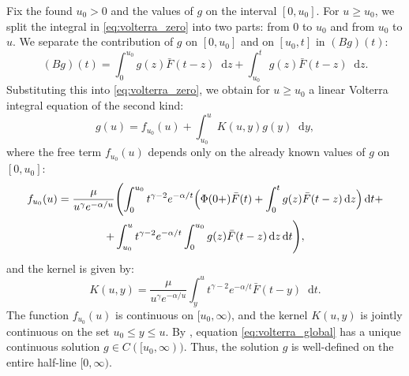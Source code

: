 \documentclass[smallextended]{svjour3}
\providecommand{\diff}{\mathop{}\!\mathrm{d}}
\begin{document}
Fix the found $u_0>0$ and the values of $g$ on the interval $[0, u_0]$. For $u \ge u_0$, we split the integral in \eqref{eq:volterra_zero} into two parts: from $0$ to $u_0$ and from $u_0$ to $u$. We separate the contribution of $g$ on $[0,u_0]$ and on $[u_0,t]$ in $(Bg)(t)$:
\[
(Bg)(t) = \int_0^{u_0} g(z)\bar F(t-z) \diff z + \int_{u_0}^t g(z)\bar F(t-z) \diff z.
\]
Substituting this into \eqref{eq:volterra_zero}, we obtain for $u \ge u_0$ a linear Volterra integral equation of the second kind:
\begin{equation}\label{eq:volterra_global}
g(u) = f_{u_0}(u) + \int_{u_0}^u K(u,y) g(y) \diff y,
\end{equation}
where the free term $f_{u_0}(u)$ depends only on the already known values of $g$ on $[0, u_0]$:
\begin{multline*}
f_{u_0}(u) = \frac{\mu}{u^\gamma e^{-\alpha/u}} \Biggl( \int_0^{u_0} t^{\gamma-2} e^{-\alpha/t} \Bigl( \Phi(0+)\bar F(t) + \int_0^t g(z)\bar F(t-z) \diff z \Bigr) \diff t +
\\
+ \int_{u_0}^u t^{\gamma-2} e^{-\alpha/t} \int_0^{u_0} g(z)\bar F(t-z) \diff z \diff t \Biggr),
\end{multline*}
and the kernel is given by:
\[
K(u,y) = \frac{\mu}{u^\gamma e^{-\alpha/u}} \int_y^u t^{\gamma-2} e^{-\alpha/t} \bar F(t-y) \diff t.
\]
The function $f_{u_0}(u)$ is continuous on $[u_0,\infty)$, and the kernel $K(u,y)$ is jointly continuous on the set $u_0 \le y \le u$. By \cite[Theorem 2.1.1]{Burton1983}, equation \eqref{eq:volterra_global} has a unique continuous solution $g \in C([u_0,\infty))$. Thus, the solution $g$ is well-defined on the entire half-line $[0,\infty)$.
\end{document}
